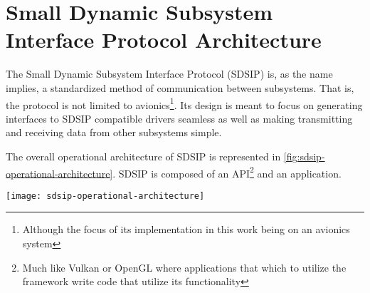 \section{Small Dynamic Subsystem Interface Protocol Architecture}
\label{sec:sdsip}

The Small Dynamic Subsystem Interface Protocol (SDSIP) is, as the name implies, a standardized method of communication
between subsystems. That is, the protocol is not limited to avionics\footnote{Although the focus of its implementation
  in this work being on an avionics system}. Its design is meant to focus on generating interfaces to SDSIP compatible
drivers seamless as well as making transmitting and receiving data from other subsystems simple.

The overall operational architecture of SDSIP is represented in \autoref{fig:sdsip-operational-architecture}. SDSIP is
composed of an API\footnote{Much like Vulkan or OpenGL where applications that which to utilize the framework write code that utilize its functionality} and an application.

\begin{figure*}[ht]
  \begin{center}
    \texttt{[image: sdsip-operational-architecture]}
  \end{center}
  \caption{}
  \label{fig:sdsip-operational-architecture}
\end{figure*}
